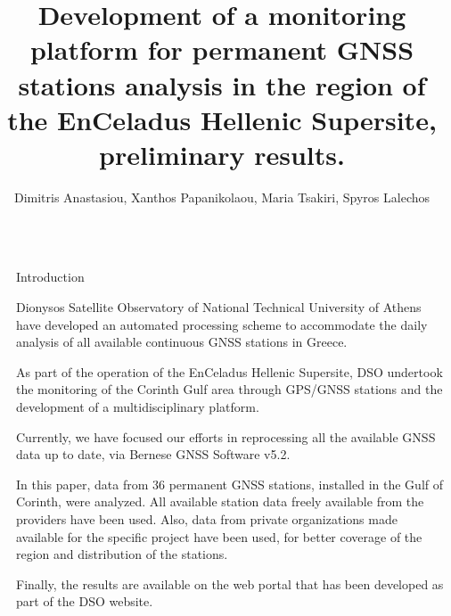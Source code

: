 \documentclass[final,a0,portrait]{beamer}
\title{Development of a monitoring platform for permanent GNSS stations analysis in the region of the EnCeladus Hellenic Supersite, preliminary results.} %
\author{Dimitris Anastasiou, Xanthos Papanikolaou, Maria Tsakiri, Spyros Lalechos}%
\institute{Dionysos Satellite Obseratory, School of Rural Surveying and Geomatics Engineering, NTUA\\ \vspace{0.3em} \par{Erthquake Planning and Protection Organization}} %
\newlength{\sepwid}
\newlength{\onecolwid}
\begin{document}

\setlength{\belowcaptionskip}{2ex} %
\setlength\belowdisplayshortskip{2ex} %

\begin{frame}[t] %

\begin{columns}[t] %

\begin{column}{\sepwid}\end{column} %

\begin{column}{\onecolwid} %


\begin{block}{Introduction}
{\small
Dionysos Satellite Observatory of National Technical University of Athens
have developed an automated processing scheme to accommodate the daily analysis of all available continuous GNSS stations in Greece.

As part of the operation of the EnCeladus Hellenic Supersite, DSO undertook the monitoring of the Corinth Gulf area through GPS/GNSS stations and the development of a multidisciplinary platform.

Currently, we have focused our efforts in reprocessing all the available GNSS data up to date, via Bernese GNSS Software v5.2\cite{bernese}.

In this paper, data from 36 permanent GNSS stations, installed in the Gulf of Corinth, were analyzed. All available station data freely available from the providers have been used. Also, data from private organizations made available for the specific project have been used, for better coverage of the region and distribution of the stations. 

Finally, the results are available on the web portal that has been developed as part of the DSO website. 

}
\end{block}
\end{column}
\end{columns}
\end{frame}
\end{document}
